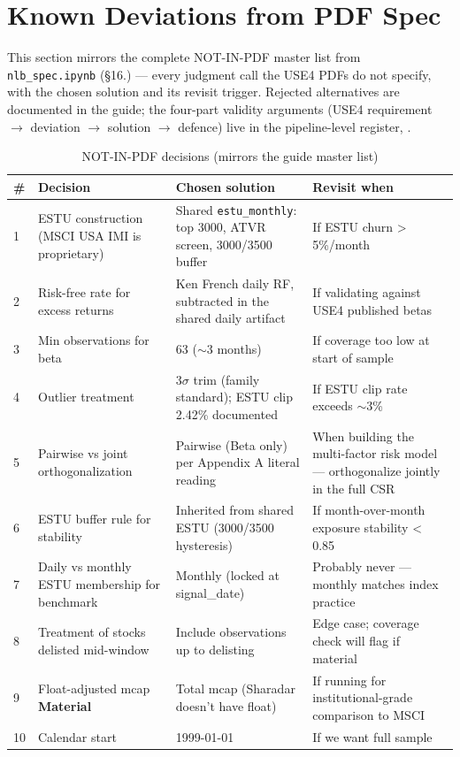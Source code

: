 \documentclass[11pt,a4paper]{article}
\newcommand{\WARN}[1]{\textcolor{warn}{\textbf{#1}}}
\begin{document}
\section{Known Deviations from PDF Spec}

This section mirrors the complete NOT-IN-PDF master list from
\texttt{nlb\_spec.ipynb} (\S16.) --- every judgment call the USE4 PDFs do not
specify, with the chosen solution and its revisit trigger. Rejected alternatives
are documented in the guide; the four-part validity arguments (USE4 requirement
$\to$ deviation $\to$ solution $\to$ defence) live in the pipeline-level
register, .

\begin{longtable}{@{}p{0.5cm}p{3.6cm}p{6.0cm}p{3.8cm}@{}}
\caption{NOT-IN-PDF decisions (mirrors the guide master list)}\\
\toprule
\textbf{\#} & \textbf{Decision} & \textbf{Chosen solution} & \textbf{Revisit when} \\
\midrule
\endhead
1 & ESTU construction (MSCI USA IMI is proprietary) & Shared \texttt{estu\_monthly}: top 3000, ATVR screen, 3000/3500 buffer & If ESTU churn > 5\%/month \\[3pt]
2 & Risk-free rate for excess returns & Ken French daily RF, subtracted in the shared daily artifact & If validating against USE4 published betas \\[3pt]
3 & Min observations for beta & 63 ($\sim$3 months) & If coverage too low at start of sample \\[3pt]
4 & Outlier treatment & 3$\sigma$ trim (family standard); ESTU clip 2.42\% documented & If ESTU clip rate exceeds $\sim$3\% \\[3pt]
5 & Pairwise vs joint orthogonalization & Pairwise (Beta only) per Appendix A literal reading & When building the multi-factor risk model --- orthogonalize jointly in the full CSR \\[3pt]
6 & ESTU buffer rule for stability & Inherited from shared ESTU (3000/3500 hysteresis) & If month-over-month exposure stability < 0.85 \\[3pt]
7 & Daily vs monthly ESTU membership for benchmark & Monthly (locked at signal\_date) & Probably never --- monthly matches index practice \\[3pt]
8 & Treatment of stocks delisted mid-window & Include observations up to delisting & Edge case; coverage check will flag if material \\[3pt]
9 & Float-adjusted mcap \WARN{Material} & Total mcap (Sharadar doesn't have float) & If running for institutional-grade comparison to MSCI \\[3pt]
10 & Calendar start & 1999-01-01 & If we want full sample \\[3pt]
\bottomrule
\end{longtable}
\end{document}
